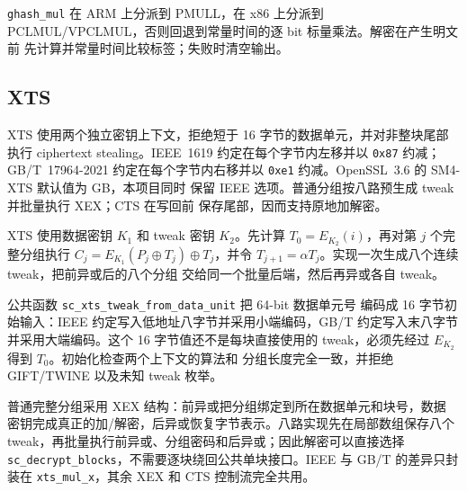 \documentclass[11pt,a4paper,UTF8,fontset=none]{ctexart}
\begin{document}
\texttt{ghash\_mul} 在 ARM 上分派到 PMULL，在 x86 上分派到
PCLMUL/VPCLMUL，否则回退到常量时间的逐 bit 标量乘法。解密在产生明文前
先计算并常量时间比较标签；失败时清空输出。

\subsection{XTS}

XTS 使用两个独立密钥上下文，拒绝短于 16 字节的数据单元，并对非整块尾部
执行 ciphertext stealing。IEEE~1619 约定在每个字节内左移并以
\texttt{0x87} 约减；GB/T~17964-2021 约定在每个字节内右移并以
\texttt{0xe1} 约减。OpenSSL~3.6 的 SM4-XTS 默认值为 GB，本项目同时
保留 IEEE 选项。普通分组按八路预生成 tweak 并批量执行 XEX；CTS 在写回前
保存尾部，因而支持原地加解密。

XTS 使用数据密钥 \(K_1\) 和 tweak 密钥 \(K_2\)。先计算
\(T_0=E_{K_2}(i)\)，再对第 \(j\) 个完整分组执行
\(C_j=E_{K_1}(P_j\oplus T_j)\oplus T_j\)，并令
\(T_{j+1}=\alpha T_j\)。实现一次生成八个连续 tweak，把前异或后的八个分组
交给同一个批量后端，然后再异或各自 tweak。

公共函数 \texttt{sc\_xts\_tweak\_from\_data\_unit} 把 64-bit 数据单元号
编码成 16 字节初始输入：IEEE 约定写入低地址八字节并采用小端编码，GB/T
约定写入末八字节并采用大端编码。这个 16 字节值还不是每块直接使用的
tweak，必须先经过 \(E_{K_2}\) 得到 \(T_0\)。初始化检查两个上下文的算法和
分组长度完全一致，并拒绝 GIFT/TWINE 以及未知 tweak 枚举。

普通完整分组采用 XEX 结构：前异或把分组绑定到所在数据单元和块号，数据
密钥完成真正的加/解密，后异或恢复字节表示。八路实现先在局部数组保存八个
tweak，再批量执行前异或、分组密码和后异或；因此解密可以直接选择
\texttt{sc\_decrypt\_blocks}，不需要逐块绕回公共单块接口。IEEE 与 GB/T
的差异只封装在 \texttt{xts\_mul\_x}，其余 XEX 和 CTS 控制流完全共用。
\end{document}
